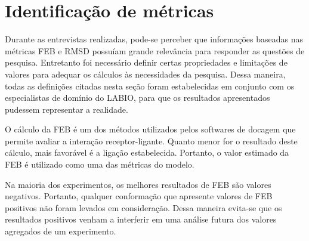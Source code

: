 \begin{table}[h]
\caption{Questões de pesquisa identificadas pelos especialistas com maior relevância para análise de experimentos de docagem}
\label{tab:questaoNegocio}
\centering
{}
\end{table}

\section{Identificação de métricas}
\label{sec:IdentificacaoDeMetricas}

Durante as entrevistas realizadas, pode-se perceber que informações baseadas nas métricas FEB e RMSD possuíam grande relevância para responder as questões de pesquisa. Entretanto foi necessário definir certas propriedades e limitações de valores para adequar os cálculos às necessidades da pesquisa. Dessa maneira, todas as definições citadas nesta seção foram estabelecidas em conjunto com os especialistas de domínio do LABIO, para que os resultados apresentados pudessem representar a realidade.

O cálculo da FEB é um dos métodos utilizados pelos softwares de docagem que permite avaliar a interação receptor-ligante. Quanto menor for o resultado deste cálculo, mais favorável é a ligação estabelecida. Portanto, o valor estimado da FEB é utilizado como uma das métricas do modelo.

Na maioria dos experimentos, os melhores resultados de FEB são valores negativos. Portanto, qualquer conformação que apresente valores de FEB positivos não foram levados em consideração. Dessa maneira evita-se que os resultados positivos venham a interferir em uma análise futura dos valores agregados de um experimento. 

